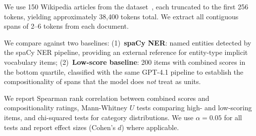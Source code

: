 We use 150 Wikipedia articles from the \footprints dataset~\cite{feucht2024token}, each truncated to the first 256 tokens, yielding approximately 38{,}400 tokens total.
We extract all contiguous spans of 2--6 tokens from each document.

We compare against two baselines:
(1)~\textbf{spaCy NER}: named entities detected by the spaCy NER pipeline, providing an external reference for entity-type implicit vocabulary items;
(2)~\textbf{Low-score baseline}: 200 items with combined scores in the bottom quartile, classified with the same GPT-4.1 pipeline to establish the compositionality of spans that the model does \emph{not} treat as units.

We report Spearman rank correlation between combined scores and compositionality ratings, Mann-Whitney $U$ tests comparing high- and low-scoring items, and chi-squared tests for category distributions.
We use $\alpha = 0.05$ for all tests and report effect sizes (Cohen's $d$) where applicable.
